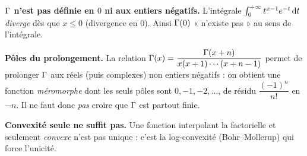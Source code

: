 \begin{mdframed}[style=cexbar]
  \textbf{$\Gamma$ n'est pas définie en $0$ ni aux entiers négatifs.}\enspace%
  L'intégrale $\int_0^{+\infty} t^{x-1}e^{-t}\,\mathrm{d}t$ \emph{diverge} dès que
  $x\leq 0$ (divergence en $0$). Ainsi $\Gamma(0)$ « n'existe pas » au sens de
  l'intégrale.

  \smallskip\noindent
  \textbf{Pôles du prolongement.}\enspace%
  La relation $\Gamma(x)=\dfrac{\Gamma(x+n)}{x(x+1)\cdots(x+n-1)}$ permet de
  prolonger $\Gamma$ aux réels (puis complexes) non entiers négatifs : on obtient
  une fonction \textit{méromorphe} dont les seuls pôles sont $0,-1,-2,\dots$,
  de résidu $\dfrac{{(-1)}^n}{n!}$ en $-n$. Il ne faut donc \emph{pas} croire
  que $\Gamma$ est partout finie.

  \smallskip\noindent
  \textbf{Convexité seule ne suffit pas.}\enspace%
  Une fonction interpolant la factorielle et seulement \emph{convexe} n'est pas
  unique : c'est la log-convexité (Bohr--Mollerup) qui force l'unicité.
\end{mdframed}

\vspace{6pt}
\exolabel

